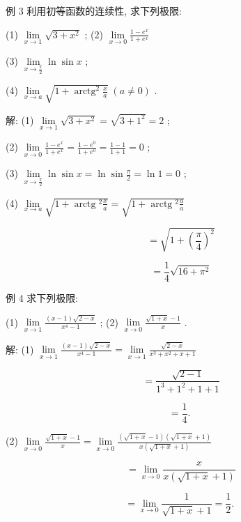 \documentclass[10pt]{article}
\begin{document}
例 3 利用初等函数的连续性, 求下列极限:

(1) \(\mathop{\lim }\limits_{{x \rightarrow 1}}\sqrt{3 + {x}^{2}}\) ; (2) \(\mathop{\lim }\limits_{{x \rightarrow 0}}\frac{1 - {e}^{x}}{1 + {e}^{x}}\)

(3) \(\mathop{\lim }\limits_{{x \rightarrow \frac{\pi }{2}}}\ln \sin x\) ;

(4) \(\mathop{\lim }\limits_{{x \rightarrow a}}\sqrt{1 + {\operatorname{arctg}}^{2}\frac{x}{a}}\;\left( {a \neq 0}\right)\) .

解: (1) \(\mathop{\lim }\limits_{{x \rightarrow 1}}\sqrt{3 + {x}^{2}} = \sqrt{3 + {1}^{2}} = 2\) ;

(2) \(\mathop{\lim }\limits_{{x \rightarrow 0}}\frac{1 - {e}^{x}}{1 + {e}^{x}} = \frac{1 - {e}^{0}}{1 + {e}^{0}} = \frac{1 - 1}{1 + 1} = 0\) ;

(3) \(\mathop{\lim }\limits_{{x \rightarrow \frac{\pi }{2}}}\ln \sin x = \ln \sin \frac{\pi }{2} = \ln 1 = 0\) ;

(4) \(\mathop{\lim }\limits_{{x \rightarrow a}}\sqrt{1 + \operatorname{arctg}{}^{2}\frac{x}{a}} = \sqrt{1 + \operatorname{arctg}{}^{2}\frac{a}{a}}\)

\[
= \sqrt{1 + {\left( \frac{\pi }{4}\right) }^{2}}
\]

\[
= \frac{1}{4}\sqrt{{16} + {\pi }^{2}}
\]

例 4 求下列极限:

(1) \(\mathop{\lim }\limits_{{x \rightarrow 1}}\frac{\left( {x - 1}\right) \sqrt{2 - x}}{{x}^{4} - 1}\) ; (2) \(\mathop{\lim }\limits_{{x \rightarrow 0}}\frac{\sqrt{1 + x} - 1}{x}\) .

解: (1) \(\mathop{\lim }\limits_{{x \rightarrow 1}}\frac{\left( {x - 1}\right) \sqrt{2 - x}}{{x}^{4} - 1} = \mathop{\lim }\limits_{{x \rightarrow 1}}\frac{\sqrt{2 - x}}{{x}^{3} + {x}^{2} + x + 1}\)

\[
= \frac{\sqrt{2 - 1}}{{1}^{3} + {1}^{2} + 1 + 1}
\]

\[
= \frac{1}{4}\text{. }
\]

(2) \(\mathop{\lim }\limits_{{x \rightarrow 0}}\frac{\sqrt{1 + x} - 1}{x} = \mathop{\lim }\limits_{{x \rightarrow 0}}\frac{\left( {\sqrt{1 + x} - 1}\right) \left( {\sqrt{1 + x} + 1}\right) }{x\left( {\sqrt{1 + x} + 1}\right) }\)

\[
= \mathop{\lim }\limits_{{x \rightarrow 0}}\frac{x}{x\left( {\sqrt{1 + x} + 1}\right) }
\]

\[
= \mathop{\lim }\limits_{{x \rightarrow 0}}\frac{1}{\sqrt{1 + x} + 1} = \frac{1}{2}\text{. }
\]
\end{document}
